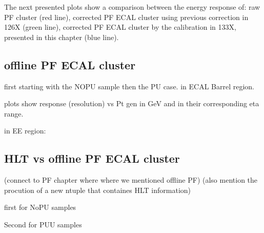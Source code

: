 The next presented plots show a comparison between the energy response of: 
 raw PF cluster (red line), corrected PF ECAL cluster using previous correction in 126X (green line),  
corrected PF ECAL cluster by the calibration in 133X, presented in this chapter (blue line).

\subsection{offline PF ECAL cluster}

first starting with the NOPU sample then the PU case. in ECAL Barrel region. 

plots show response (resolution) vs Pt gen in GeV and in their corresponding eta range.






in EE region:





\subsection{HLT vs offline PF ECAL cluster}

(connect to PF chapter where where we mentioned offline PF)
(also mention the procution of a new ntuple that containes HLT information) 

first for NoPU samples

Second for PUU samples

